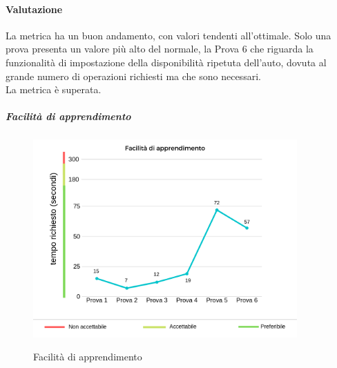 	\paragraph*{Valutazione} La metrica ha un buon andamento, con valori tendenti all'ottimale. Solo una prova presenta un valore più alto del normale, la Prova 6 che riguarda la funzionalità di impostazione della disponibilità ripetuta dell'auto, dovuta al grande numero di operazioni richiesti ma che sono necessari. 
	\\
	La metrica è superata.
	\pagebreak
	\subparagraph{Facilità di apprendimento}
	\begin{center}
		\begin{figure}[h] 
			\centering 
			\includegraphics[width=0.90\textwidth]{res/images/new/facilitaApprendimento.png}\\
			\caption{Facilità di apprendimento}
		\end{figure}
	\end{center}

